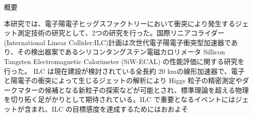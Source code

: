 
\begin{center}
\iffalse
\thispagestyle{empty}
{\Large 修士論文テンプレート}\\
九州大学大学院 理学府 物理学専攻 \\ 粒子物理学分野 素粒子実験研究室 \\
素粒子\ 実験 \\[1ex] 指導教員\ 氏\ 名\\ 　 \\
\fi
{\huge 概要}\\
\end{center}

本研究では、電子陽電子ヒッグスファクトリーにおいて衝突により発生するジェット測定技術の研究として、2つの研究を行った。国際リニアコライダー(International Linear Collider:ILC)計画は次世代電子陽電子衝突型加速器であり、その検出器案であるシリコンタングステン電磁カロリメータ Sillicon Tangsten Electromagnetic Calorimeter (SiW-ECAL) の性能評価に関する研究を行った。
ILC は現在建設が検討されている全長約 20 kmの線形加速器で、電子と陽電子の衝突によって生じるジェットの解析により Higgs 粒子の精密測定やダークマターの候補となる新粒子の探索などが可能とされ、標準理論を超える物理を切り拓く足がかりとして期待されている。ILC で重要となるイベントにはジェットが含まれ、ILC の目標感度を達成するためにはおおよそ

\cite{sample}